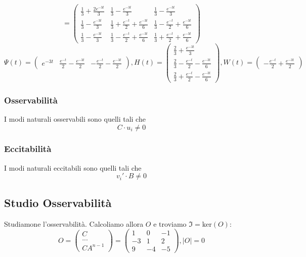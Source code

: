 \documentclass{article}
\begin{document}
\[ = \left(\begin{matrix}\frac{1}{3} + \frac{2 e^{- 3 t}}{3} & \frac{1}{3} - \frac{e^{- 3 t}}{3} & \frac{1}{3} - \frac{e^{- 3 t}}{3}\\\frac{1}{3} - \frac{e^{- 3 t}}{3} & \frac{1}{3} + \frac{e^{- t}}{2} + \frac{e^{- 3 t}}{6} & \frac{1}{3} - \frac{e^{- t}}{2} + \frac{e^{- 3 t}}{6}\\\frac{1}{3} - \frac{e^{- 3 t}}{3} & \frac{1}{3} - \frac{e^{- t}}{2} + \frac{e^{- 3 t}}{6} & \frac{1}{3} + \frac{e^{- t}}{2} + \frac{e^{- 3 t}}{6}\end{matrix}\right) \]\[ \Psi(t) = \left(\begin{matrix}e^{- 3 t} & \frac{e^{- t}}{2} - \frac{e^{- 3 t}}{2} & - \frac{e^{- t}}{2} - \frac{e^{- 3 t}}{2}\end{matrix}\right), H(t) =  \left(\begin{matrix}\frac{2}{3} + \frac{e^{- 3 t}}{3}\\\frac{2}{3} - \frac{e^{- t}}{2} - \frac{e^{- 3 t}}{6}\\\frac{2}{3} + \frac{e^{- t}}{2} - \frac{e^{- 3 t}}{6}\end{matrix}\right),W(t) = \left(\begin{matrix}- \frac{e^{- t}}{2} + \frac{e^{- 3 t}}{2}\end{matrix}\right)\]\subsubsection{Osservabilità}
 I modi naturali osservabili sono quelli tali che 
\[ C \cdot u_i   \neq 0\]
\subsubsection{Eccitabilità}
 I modi naturali eccitabili sono quelli tali che 
\[v_i' \cdot B \neq 0\]

\subsection{Studio Osservabilità}

Studiamone l'osservabilità. Calcoliamo allora $O$ e troviamo $\mathfrak{I} = \text{ker}(O)$:
\[
 O = \begin{pmatrix}C \\ ... \\ CA^{n-1}  \end{pmatrix} = \left(\begin{matrix}1 & 0 & -1\\-3 & 1 & 2\\9 & -4 & -5\end{matrix}\right), |O| = 0 \]
\end{document}
